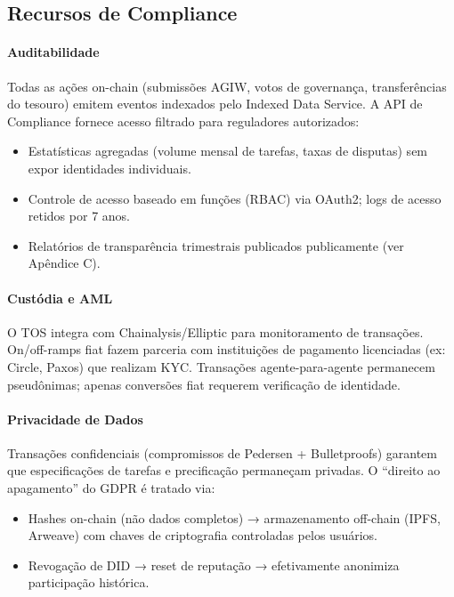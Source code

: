 \documentclass[11pt]{article}
\begin{document}
\begin{itemize}[noitemsep]
\begin{itemize}[noitemsep]
\begin{itemize}[noitemsep]
\subsection{Recursos de Compliance}

\paragraph{Auditabilidade}
Todas as ações on-chain (submissões AGIW, votos de governança, transferências do tesouro) emitem eventos indexados pelo Indexed Data Service. A API de Compliance fornece acesso filtrado para reguladores autorizados:
\begin{itemize}[noitemsep]
  \item Estatísticas agregadas (volume mensal de tarefas, taxas de disputas) sem expor identidades individuais.
  \item Controle de acesso baseado em funções (RBAC) via OAuth2; logs de acesso retidos por 7 anos.
  \item Relatórios de transparência trimestrais publicados publicamente (ver Apêndice C).
\end{itemize}

\paragraph{Custódia e AML}
O TOS integra com Chainalysis/Elliptic para monitoramento de transações. On/off-ramps fiat fazem parceria com instituições de pagamento licenciadas (ex: Circle, Paxos) que realizam KYC. Transações agente-para-agente permanecem pseudônimas; apenas conversões fiat requerem verificação de identidade.

\paragraph{Privacidade de Dados}
Transações confidenciais (compromissos de Pedersen + Bulletproofs) garantem que especificações de tarefas e precificação permaneçam privadas. O ``direito ao apagamento'' do GDPR é tratado via:
\begin{itemize}[noitemsep]
  \item Hashes on-chain (não dados completos) → armazenamento off-chain (IPFS, Arweave) com chaves de criptografia controladas pelos usuários.
  \item Revogação de DID → reset de reputação → efetivamente anonimiza participação histórica.
\end{itemize}


\end{itemize}
\end{itemize}
\end{itemize}
\end{document}
